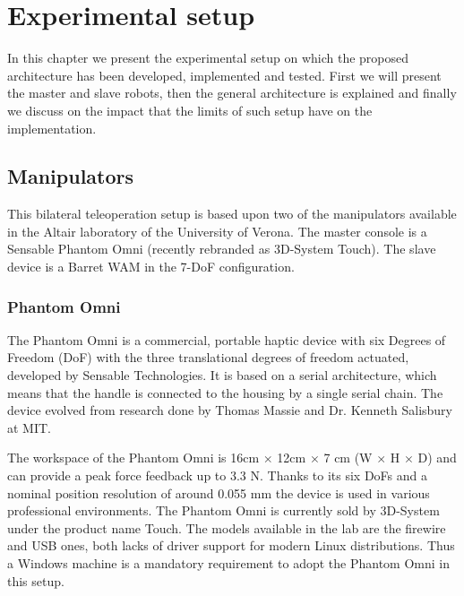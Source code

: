 \chapter{Experimental setup}
In this chapter we present the experimental setup on which the proposed architecture has been developed, implemented and tested.
First we will present the master and slave robots,  then the general architecture is explained and finally we discuss on the impact that the limits of such setup have on the implementation.

\section{Manipulators}
This bilateral teleoperation setup is based upon two of the manipulators available in the Altair laboratory of the University of Verona.
The master console is a Sensable Phantom Omni (recently rebranded as 3D-System Touch).
The slave device is a Barret WAM in the 7-DoF configuration.

\subsection{Phantom Omni}
The Phantom Omni is a commercial, portable haptic device with six Degrees of Freedom (DoF) with the three translational degrees of freedom actuated, developed by Sensable Technologies. It is based on a serial architecture, which means that the handle is connected to the housing by a single serial chain.
The device evolved from research done by Thomas Massie and Dr. Kenneth Salisbury at MIT.

The workspace of the Phantom Omni is 16cm $\times$ 12cm $\times$ 7 cm (W $\times$ H $\times$ D) and can provide a peak force feedback up to 3.3 N. Thanks to its six DoFs and a nominal position resolution of around 0.055 mm the device is used in various professional environments. The Phantom Omni is currently sold by 3D-System under the product name Touch.
The models available in the lab are the firewire  and USB ones, both lacks of driver support for modern Linux distributions. Thus a Windows machine is a mandatory requirement to adopt the Phantom Omni in this setup.

